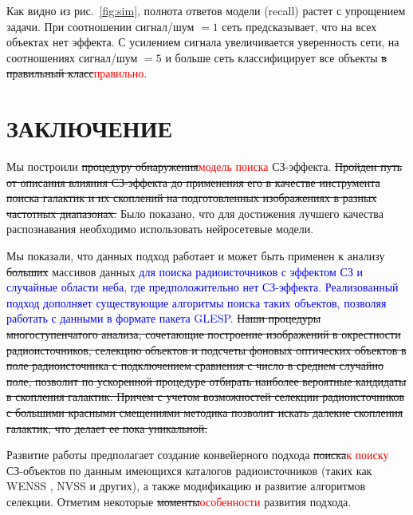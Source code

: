\documentclass[
aps,%
12pt,%
final,%
notitlepage,%
oneside,%
onecolumn,%
nobibnotes,%
nofootinbib,%
superscriptaddress,%
noshowpacs,%
centertags]%
{revtex4}
\begin{document}
Как видно из рис.~\ref{fig:sim}, полнота ответов модели (recall) растет с упрощением задачи. При соотношении сигнал/шум $=1$ сеть предсказывает, что на всех объектах нет эффекта. С усилением сигнала увеличивается уверенность сети, на соотношениях сигнал/шум $=5$ и больше сеть классифицирует все объекты \sout{в правильный класс}\textcolor{red}{правильно}.


\section{ЗАКЛЮЧЕНИЕ}
\label{sec:conclusion}

Мы построили \sout{процедуру обнаружения}\textcolor{red}{модель поиска} СЗ-эффекта. \sout{Пройден путь от описания влияния СЗ-эффекта до применения его в качестве инструмента поиска галактик и их скоплений на подготовленных изображениях в разных частотных диапазонах.} Было показано, что для достижения лучшего качества распознавания необходимо использовать нейросетевые модели.

Мы показали, что данных подход работает и может быть применен к анализу \sout{больших} массивов данных \textcolor{blue}{для поиска радиоисточников с эффектом СЗ и случайные области неба, где предположительно нет СЗ-эффекта. Реализованный подход дополняет существующие алгоритмы \cite{Bonjean2019} поиска таких объектов, позволяя работать с данными в формате пакета GLESP.} \sout{Наши процедуры многоступенчатого анализа, сочетающие построение изображений в окрестности радиоисточников, селекцию объектов и подсчеты фоновых оптических объектов в поле радиоисточника с подключением сравнения с число в среднем случайно поле, позволит по ускоренной процедуре отбирать наиболее вероятные кандидаты в скопления галактик. Причем с учетом возможностей селекции радиоисточников с большими красными смещениями методика позволит искать далекие скопления галактик, что делает ее пока уникальной.}

Развитие работы предполагает создание конвейерного подхода \sout{поиска}\textcolor{red}{к поиску} СЗ-объектов по данным имеющихся каталогов радиоисточников (таких как WENSS \cite{Rengelink}, NVSS \cite{Condon} и других), а также модификацию и развитие алгоритмов селекции. Отметим некоторые \sout{моменты}\textcolor{red}{особенности} развития подхода.
\end{document}

